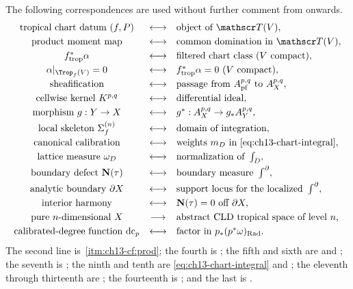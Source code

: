 The following correspondences are used without further comment from
 onwards.
\[
\begin{array}{ccl}
\text{tropical chart datum }(f,P)
 &\longleftrightarrow&
 \text{object of }\mathscr T(V),\\[1mm]
\text{product moment map}
 &\longleftrightarrow&
 \text{common domination in }\mathscr T(V),\\[1mm]
f_{\mathrm{trop}}^*\alpha
 &\longleftrightarrow&
 \text{filtered chart class }(V\text{ compact}),\\[1mm]
\alpha|_{\Trop_f(V)}=0
 &\longleftrightarrow&
 f_{\mathrm{trop}}^*\alpha=0\ (V\text{ compact}),\\[1mm]
\text{sheafification}
 &\longleftrightarrow&
 \text{passage from }A^{p,q}_{\mathrm{pf}}\text{ to }A^{p,q}_X,\\[1mm]
\text{cellwise kernel }K^{p,q}
 &\longleftrightarrow&
 \text{differential ideal},\\[1mm]
\text{morphism }g:Y\to X
 &\longleftrightarrow&
 g^*:A^{p,q}_X\to g_*A^{p,q}_Y,\\[1mm]
\text{local skeleton }\Sigma_f^{(n)}
 &\longleftrightarrow&
 \text{domain of integration},\\[1mm]
\text{canonical calibration}
 &\longleftrightarrow&
 \text{weights }m_D\text{ in }\eqref{eq:ch13-chart-integral},\\[1mm]
\text{lattice measure }\omega_D
 &\longleftrightarrow&
 \text{normalization of }\int_D,\\[1mm]
\text{boundary defect }\mathbf N(\tau)
 &\longleftrightarrow&
 \text{boundary measure }\textstyle\int^\partial,\\[1mm]
\text{analytic boundary }\partial X
 &\longleftrightarrow&
 \text{support locus for the localized }\textstyle\int^\partial,\\[1mm]
\text{interior harmony}
 &\longleftrightarrow&
 \mathbf N(\tau)=0\text{ off }\partial X,\\[1mm]
\text{pure }n\text{-dimensional }X
 &\longrightarrow&
 \text{abstract CLD tropical space of level }n,\\[1mm]
\text{calibrated-degree function }\mathrm{dc}_p
 &\longleftrightarrow&
 \text{factor in }p_*(p^*\omega)_{\mathrm{Rad}} .
\end{array}
\]
The second line is
\,\cref{itm:ch13-cf:prod}; the fourth is
; the fifth and sixth are  and
; the seventh is
; the ninth and tenth are
\eqref{eq:ch13-chart-integral} and ; the
eleventh through thirteenth are
; the
fourteenth is ; and the last is
.

